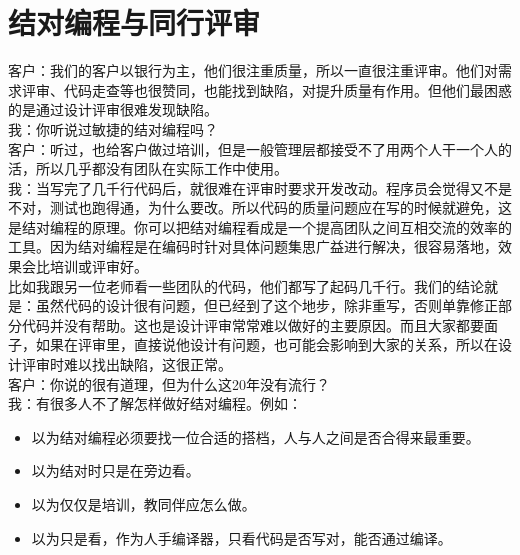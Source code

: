 \chapter{结对编程与同行评审} %

客户：我们的客户以银行为主，他们很注重质量，所以一直很注重评审。他们对需求评审、代码走查等也很赞同，也能找到缺陷，对提升质量有作用。但他们最困惑的是通过设计评审很难发现缺陷。\\
我：你听说过敏捷的结对编程吗？\\
客户：听过，也给客户做过培训，但是一般管理层都接受不了用两个人干一个人的活，所以几乎都没有团队在实际工作中使用。\\
我：当写完了几千行代码后，就很难在评审时要求开发改动。程序员会觉得又不是不对，测试也跑得通，为什么要改。所以代码的质量问题应在写的时候就避免，这是结对编程的原理。你可以把结对编程看成是一个提高团队之间互相交流的效率的工具。因为结对编程是在编码时针对具体问题集思广益进行解决，很容易落地，效果会比培训或评审好。\\
比如我跟另一位老师看一些团队的代码，他们都写了起码几千行。我们的结论就是：虽然代码的设计很有问题，但已经到了这个地步，除非重写，否则单靠修正部分代码并没有帮助。这也是设计评审常常难以做好的主要原因。而且大家都要面子，如果在评审里，直接说他设计有问题，也可能会影响到大家的关系，所以在设计评审时难以找出缺陷，这很正常。\\
客户：你说的很有道理，但为什么这20年没有流行？\\
我：有很多人不了解怎样做好结对编程。例如：

\begin{itemize}
\tightlist
\item
  以为结对编程必须要找一位合适的搭档，人与人之间是否合得来最重要。
\item
  以为结对时只是在旁边看。
\item
  以为仅仅是培训，教同伴应怎么做。
\item
  以为只是看，作为人手编译器，只看代码是否写对，能否通过编译。
\end{itemize}

